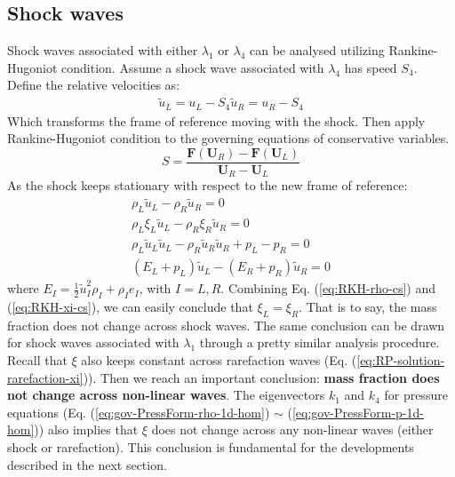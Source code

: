 \subsection{Shock waves}
Shock waves associated with either $\lambda_1$ or $\lambda_4$ can be analysed utilizing Rankine-Hugoniot condition. Assume a shock wave associated with $\lambda_4$ has speed $S_4$. Define the relative velocities as:
\begin{eqnarray}
\tilde{u}_L = u_L - S_4
\tilde{u}_R = u_R - S_4
\end{eqnarray}
Which transforms the frame of reference moving with the shock. Then apply Rankine-Hugoniot condition to the governing equations of conservative variables.
\begin{equation}
S=\frac{\textbf{F}(\textbf{U}_R)-\textbf{F}(\textbf{U}_L)}{\textbf{U}_R - \textbf{U}_L}
\end{equation}
As the shock keeps stationary with respect to the new frame of reference:
\begin{eqnarray}
\rho_L \tilde{u}_L - \rho_R \tilde{u}_R = 0 \label{eq:RKH-rho-cs}\\
\rho_L \xi_L \tilde{u}_L - \rho_R \xi_R \tilde{u}_R = 0 \label{eq:RKH-xi-cs} \\
\rho_L \tilde{u}_L \tilde{u}_L - \rho_R \tilde{u}_R \tilde{u}_R + p_L - p_R = 0 \label{eq:RKH-u-cs} \\
(E_L + p_L) \tilde{u}_L - (E_R + p_R) \tilde{u}_R = 0 \label{eq:RKH-E-cs}
\end{eqnarray}
where $E_I = \frac{1}{2} \tilde{u}^2_I \rho_I + \rho_I e_I$, with $I = L , R$.
Combining Eq. (\ref{eq:RKH-rho-cs}) and (\ref{eq:RKH-xi-cs}), we can easily conclude that $\xi_L = \xi_R$. That is to say, the mass fraction does not change across shock waves. The same conclusion can be drawn for shock waves associated with $\lambda_1$ through a pretty similar analysis procedure. Recall that $\xi$ also keeps constant across rarefaction waves (Eq. (\ref{eq:RP-solution-rarefaction-xi})). Then we reach  an important conclusion: \textbf{mass fraction does not change across non-linear waves}. The eigenvectors $k_1$ and $k_4$ for pressure equations (Eq. (\ref{eq:gov-PressForm-rho-1d-hom}) $\sim$ (\ref{eq:gov-PressForm-p-1d-hom})) also implies that $\xi$ does not change across any non-linear waves (either shock or rarefaction). This conclusion is fundamental for the developments described in the next section.

